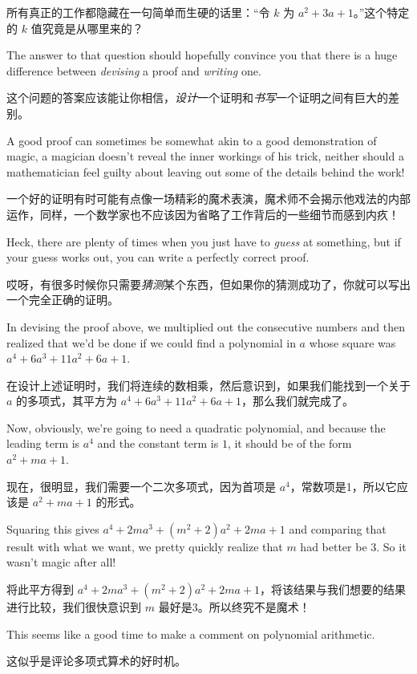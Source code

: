 所有真正的工作都隐藏在一句简单而生硬的话里：“令 $k$ 为 $a^2+3a+1$。”这个特定的 $k$ 值究竟是从哪里来的？

The answer to that question should hopefully 
convince you that there is a huge difference between \emph{devising} 
a proof and \emph{writing} one.

这个问题的答案应该能让你相信，\emph{设计}一个证明和\emph{书写}一个证明之间有巨大的差别。

A good proof can sometimes be
somewhat akin to a good demonstration of magic, a magician doesn't 
reveal the inner workings of his trick, neither should a mathematician 
feel guilty about leaving out some of the details behind the work!

一个好的证明有时可能有点像一场精彩的魔术表演，魔术师不会揭示他戏法的内部运作，同样，一个数学家也不应该因为省略了工作背后的一些细节而感到内疚！

Heck, there are plenty of times when you just have to \emph{guess} 
at something, but if your guess works out, you can write
a perfectly correct proof.

哎呀，有很多时候你只需要\emph{猜测}某个东西，但如果你的猜测成功了，你就可以写出一个完全正确的证明。

In devising the proof above, we multiplied out the consecutive numbers 
and then realized that we'd be done if we could find a polynomial in 
$a$ whose square was $a^4  + 6a^3 + 11a^2 + 6a + 1$.

在设计上述证明时，我们将连续的数相乘，然后意识到，如果我们能找到一个关于 $a$ 的多项式，其平方为 $a^4  + 6a^3 + 11a^2 + 6a + 1$，那么我们就完成了。

Now, obviously, 
we're going to need a quadratic polynomial, and because the leading 
term is $a^4$ and the constant term is $1$, it should be of the form 
$a^2 + ma + 1$.

现在，很明显，我们需要一个二次多项式，因为首项是 $a^4$，常数项是1，所以它应该是 $a^2 + ma + 1$ 的形式。

Squaring this gives $a^4 + 2ma^3 + (m^2+2)a^2 + 2ma + 1$ 
and comparing that result with what we want, we pretty quickly realize 
that $m$ had better be 3.  So it wasn't magic after all!

将此平方得到 $a^4 + 2ma^3 + (m^2+2)a^2 + 2ma + 1$，将该结果与我们想要的结果进行比较，我们很快意识到 $m$ 最好是3。所以终究不是魔术！

This seems like a good time to make a comment on polynomial arithmetic.

这似乎是评论多项式算术的好时机。

